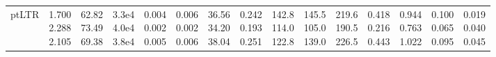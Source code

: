 \begin{landscape}
\begin{table}[t]
{\begin{tabular}{@{}lrrrrrrrrrrrrrr@{}}
ptLTR & \makecell[r]{1.700\\2.288\\2.105} & \makecell[r]{62.82\\73.49\\69.38} & \makecell[r]{3.3e4\\4.0e4\\3.8e4} & \makecell[r]{0.004\\0.002\\0.005} & \makecell[r]{0.006\\0.002\\0.006} & \makecell[r]{36.56\\34.20\\38.04} & \makecell[r]{0.242\\0.193\\0.251} & \makecell[r]{142.8\\114.0\\122.8} & \makecell[r]{145.5\\105.0\\139.0} & \makecell[r]{219.6\\190.5\\226.5} & \makecell[r]{0.418\\0.216\\0.443} & \makecell[r]{0.944\\0.763\\1.022} & \makecell[r]{0.100\\0.065\\0.095} & \makecell[r]{0.019\\0.040\\0.045} \\

\end{tabular}}
\end{table}
\end{landscape}
